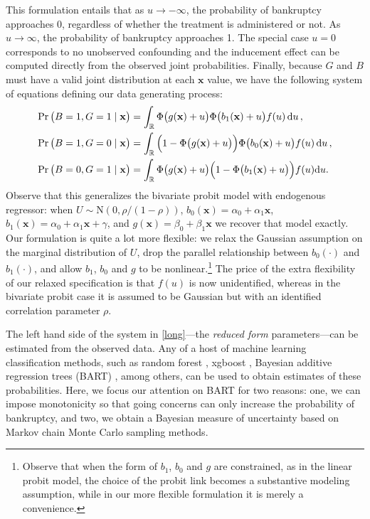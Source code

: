 \documentclass[aoas,preprint, 11pt, dvipsnames, table, x11name]{imsart}
\renewcommand{\bm}[1]{\mathbf{#1}}
\theoremstyle{remark}
\begin{document}
	This formulation entails that as $u\rightarrow -\infty$, the probability of bankruptcy approaches 0, regardless of whether the treatment is administered or not. As $u\rightarrow \infty$, the probability of bankruptcy approaches 1.  The special case $u=0$ corresponds to no unobserved confounding and the inducement effect can be computed directly from the observed joint probabilities.      	
	Finally, because $G$ and $B$ must have a valid joint distribution at each $\mathbf{x}$ value, we have the following system of equations defining our data generating process:
	\begin{equation}
		\begin{split}
			\Pr\qty(B=1, G=1\mid \bm{x})&= \int_{\mathbb{R}} \Phi\qty(g(\bm{x})+u)\Phi\qty(b_1(\bm{x})+u)f(u)\dd{u},\\
			\Pr\qty(B=1, G=0\mid \bm{x})&=\int_{\mathbb{R}} \qty(1-\Phi\qty(g(\bm{x})+u))\Phi\qty(b_0(\bm{x})+u)f(u)\dd{u},\\
			\Pr\qty(B=0, G=1\mid \bm{x})&=\int_{\mathbb{R}}\Phi\qty(g(\bm{x})+u)\qty(1-\Phi\qty(b_1(\bm{x})+u))f(u)\dd u.
			\label{long}
		\end{split}
	\end{equation}
	Observe that this generalizes the bivariate probit model with endogenous regressor: when $U \sim \mbox{N}(0, \rho/(1-\rho))$,  $b_0(\mathbf{x}) = \alpha_0 + \alpha_1 \mathbf{x}$, $b_1(\mathbf{x}) = \alpha_0 + \alpha_1 \mathbf{x} + \gamma$, and $g(\mathbf{x}) = \beta_0 + \beta_1 \mathbf{x}$ we recover that model exactly.	Our formulation is quite a lot more flexible: we relax the Gaussian assumption on the marginal distribution of $U$, drop the parallel relationship between $b_0(\cdot)$ and $b_1(\cdot)$, and allow $b_1$, $b_0$ and $g$ to be nonlinear.\footnote{Observe that when the form of $b_1$, $b_0$ and $g$ are constrained, as in the linear probit model, the choice of the probit link becomes a substantive modeling assumption, while in our more flexible formulation it is merely a convenience.} The price of the extra flexibility of our relaxed specification is that $f(u)$ is now unidentified, whereas in the bivariate probit case it is assumed to be Gaussian but with an identified correlation parameter $\rho$. 
	
	The left hand side of the system in \autoref{long}---the {\em reduced form} parameters---can be estimated from the observed data.  Any of a host of machine learning classification methods, such as random forest \citep{rf}, xgboost \citep{boost}, Bayesian additive regression trees (BART) \citep{bart}, among others, can be used to obtain estimates of these probabilities. Here, we focus our attention on BART for two reasons: one, we can impose monotonicity so that going concerns can only increase the probability of bankruptcy, and two, we obtain a Bayesian measure of uncertainty based on Markov chain Monte Carlo sampling methods. %
	
\end{document}
